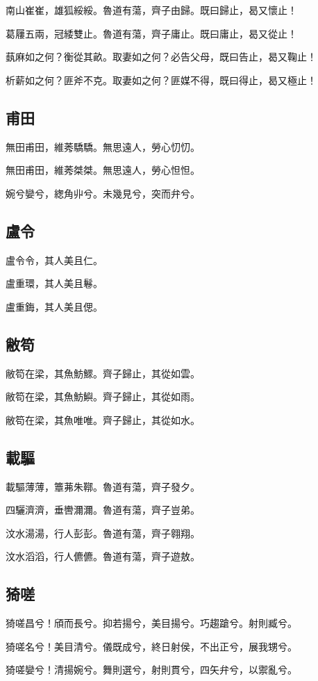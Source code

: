 南山崔崔，雄狐綏綏。魯道有蕩，齊子由歸。既曰歸止，曷又懷止！

葛屨五兩，冠緌雙止。魯道有蕩，齊子庸止。既曰庸止，曷又從止！

蓺麻如之何？衡從其畝。取妻如之何？必告父母，既曰告止，曷又鞠止！

析薪如之何？匪斧不克。取妻如之何？匪媒不得，既曰得止，曷又極止！

\subsection[甫田]{甫田}

無田甫田，維莠驕驕。無思遠人，勞心忉忉。

無田甫田，維莠桀桀。無思遠人，勞心怛怛。

婉兮孌兮，緫角丱兮。未幾見兮，突而弁兮。

\subsection[盧令]{盧令}

盧令令，其人美且仁。

盧重環，其人美且鬈。

盧重鋂，其人美且偲。

\subsection[敝笱]{敝笱}

敝笱在梁，其魚魴鰥。齊子歸止，其從如雲。

敝笱在梁，其魚魴鱮。齊子歸止，其從如雨。

敝笱在梁，其魚唯唯。齊子歸止，其從如水。

\subsection[載驅]{載驅}

載驅薄薄，簟茀朱鞹。魯道有蕩，齊子發夕。

四驪濟濟，垂轡濔濔。魯道有蕩，齊子豈弟。

汶水湯湯，行人彭彭。魯道有蕩，齊子翱翔。

汶水滔滔，行人儦儦。魯道有蕩，齊子遊敖。

\subsection[猗嗟]{猗嗟}

猗嗟昌兮！頎而長兮。抑若揚兮，美目揚兮。巧趨蹌兮。射則臧兮。

猗嗟名兮！美目清兮。儀既成兮，終日射侯，不出正兮，展我甥兮。

猗嗟孌兮！清揚婉兮。舞則選兮，射則貫兮，四矢弁兮，以禦亂兮。
